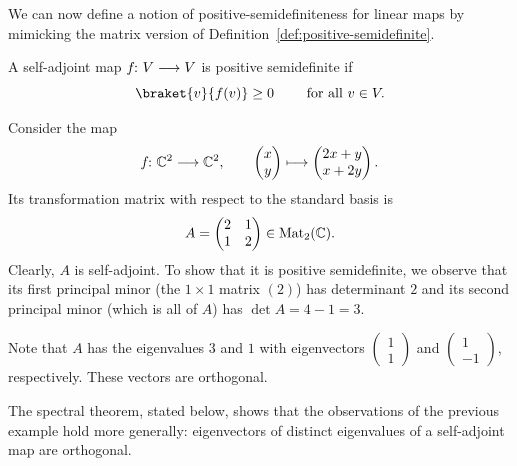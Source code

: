 \documentclass[a4paper, oneside, 12pt]{amsart}
\begin{document}
We can now define a notion of positive-semidefiniteness for linear maps by mimicking the matrix version of Definition~\ref{def:positive-semidefinite}.
\begin{definition}\label{def:positive-semidefinite-maps}
  A self-adjoint map \(f\from V \to V\) is positive semidefinite if
  \begin{equation}
    \braket{v}{f(v)} \geq 0\qquad \text{ for all } v\in V.
  \end{equation}
\end{definition}

\begin{example}\label{ex:self-adjoint-pos-definite}
  Consider the map
  \begin{equation*}
    f \from \mathbb{C}^{2} \to \mathbb{C}^{2},\qquad
    \begin{pmatrix}
      x \\ y
    \end{pmatrix} \mapsto
    \begin{pmatrix}
      2 x + y \\ x + 2y
    \end{pmatrix}.
  \end{equation*}
  Its transformation matrix with respect to the standard basis is
  \begin{equation*}
    A=
    \begin{pmatrix}
      2 & 1 \\ 1 & 2
    \end{pmatrix} \in \operatorname{Mat}_{2}( \mathbb{C}).
  \end{equation*}
  Clearly, \(A\) is self-adjoint.
  To show that it is positive semidefinite, we observe that its first principal minor (the \(1\times 1\) matrix \((2)\)) has determinant \(2\) and its second principal minor (which is all of \(A\)) has  \(\det A = 4-1=3\).

  Note that \(A\) has the eigenvalues \(3\) and \(1\) with eigenvectors \(
  \begin{pmatrix}
    1 \\ 1
  \end{pmatrix}
  \) and \(
  \begin{pmatrix}
    1 \\ -1
  \end{pmatrix}
  \), respectively.
  These vectors are orthogonal.
\end{example}
The spectral theorem, stated below, shows that the observations of the previous example hold more generally: eigenvectors  of distinct eigenvalues of a self-adjoint map are orthogonal.
\end{document}
